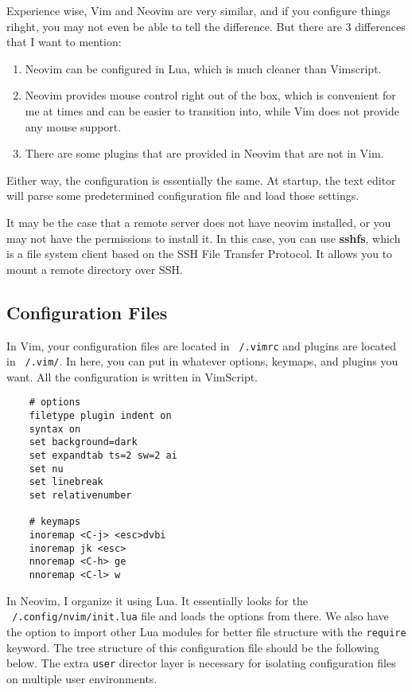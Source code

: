   \begin{example}
    Experience wise, Vim and Neovim are very similar, and if you configure things rihght, you may not even be able to tell the difference. But there are 3 differences that I want to mention: 
    \begin{enumerate}
      \item Neovim can be configured in Lua, which is much cleaner than Vimscript. 
      \item Neovim provides mouse control right out of the box, which is convenient for me at times and can be easier to transition into, while Vim does not provide any mouse support. 
      \item There are some plugins that are provided in Neovim that are not in Vim. 
    \end{enumerate}
    Either way, the configuration is essentially the same. At startup, the text editor will parse some predetermined configuration file and load those settings. 
  \end{example}

  It may be the case that a remote server does not have neovim installed, or you may not have the permissions to install it. In this case, you can use \textbf{sshfs}, which is a file system client based on the SSH File Transfer Protocol. It allows you to mount a remote directory over SSH. 

\subsection{Configuration Files}

  In Vim, your configuration files are located in \texttt{~/.vimrc} and plugins are located in \texttt{~/.vim/}. In here, you can put in whatever options, keymaps, and plugins you want. All the configuration is written in VimScript. 

  \begin{lstlisting} 
    # options 
    filetype plugin indent on 
    syntax on 
    set background=dark
    set expandtab ts=2 sw=2 ai
    set nu
    set linebreak 
    set relativenumber        
    
    # keymaps
    inoremap <C-j> <esc>dvbi
    inoremap jk <esc>
    nnoremap <C-h> ge
    nnoremap <C-l> w 
  \end{lstlisting}

  In Neovim, I organize it using Lua. It essentially looks for the \texttt{~/.config/nvim/init.lua} file and loads the options from there. We also have the option to import other Lua modules for better file structure with the \texttt{require} keyword. The tree structure of this configuration file should be the following below. The extra \texttt{user} director layer is necessary for isolating configuration files on multiple user environments.  
  
